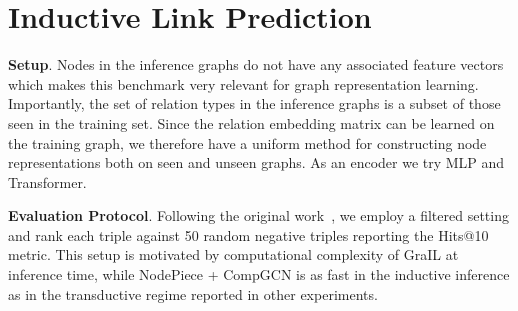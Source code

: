 \documentclass{article} \usepackage{iclr2022_conference,times}
\begin{document}
\begin{table}[t]
\centering
\caption{Relation prediction results.  denotes vocabulary size (anchors + relations).}
\label{tab:rp1}
\end{table}



\section{Inductive Link Prediction}
\label{app:ilp}

\textbf{Setup}. Nodes in the inference graphs do not have any associated feature vectors which makes this benchmark very relevant for graph representation learning.
Importantly, the set of relation types in the inference graphs is a subset of those seen in the training set. 
Since the relation embedding matrix can be learned on the training graph, we therefore have a uniform method for constructing node representations both on seen and unseen graphs.
As an encoder we try MLP and Transformer. 


\textbf{Evaluation Protocol}. 
Following the original work~\citep{DBLP:conf/icml/TeruDH20}, we employ a filtered setting and rank each triple against 50 random negative triples reporting the Hits@10 metric.  
This setup is motivated by computational complexity of GraIL at inference time, while NodePiece + CompGCN is as fast in the inductive inference as in the transductive regime reported in other experiments.
\end{document}
